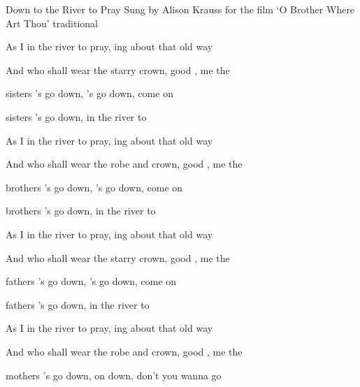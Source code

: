 \begin{SBSong}{Down to the River to Pray}
  {Sung by Alison Krauss for the film `O Brother Where Art Thou'}
  {traditional}
  \begin{SBVerse}
    As I  in the river to pray, ing about that  old way
    
    And who shall wear the starry crown, good , \WBLineBrk {} me the 

     sisters 's go down, 's go down, come on 

     sisters 's go down,  in the river to  
  \end{SBVerse}
  \begin{SBVerse}
    As I  in the river to pray, ing about that  old way

    And who shall wear the robe and crown, good , \WBLineBrk {} me the 
  
     brothers 's go down, 's go down, come on 

     brothers 's go down,  in the river to  
  \end{SBVerse}
  \begin{SBVerse}
    As I  in the river to pray, ing about that  old way
    
    And who shall wear the starry crown, good , \WBLineBrk {} me the 

     fathers 's go down, 's go down, come on 
 
     fathers 's go down,  in the river to  
  \end{SBVerse}
  \begin{SBVerse}
    As I  in the river to pray, ing about that  old way
    
    And who shall wear the robe and crown, good , \WBLineBrk {} me the 
  
     mothers 's go down,  on down, don't you wanna go 


\end{SBVerse}
\end{SBSong}

